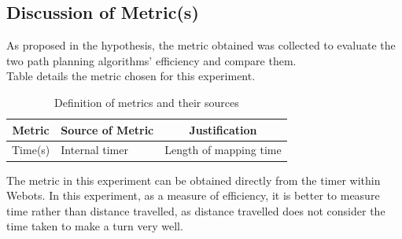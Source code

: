 \documentclass[conference]{IEEEtran}
\begin{document}
\subsection{Discussion of Metric(s)}
As proposed in the hypothesis, the metric obtained was collected to evaluate the two path planning algorithms' efficiency and compare them. \\
Table \uppercase\expandafter{} details the metric chosen for this experiment.

\begin{table}[htbp]
\centering
\setlength{\abovecaptionskip}{0.cm}
\caption{Definition of metrics and their sources}
\label{Table1}
\begin{tabular}{c|l|c}
\hline
Metric                & \multicolumn{1}{c|}{Source of Metric} & Justification     \\ \hline
Time(s)               & Internal timer            & Length of mapping time \\ \hline
\end{tabular}
\end{table}

The metric in this experiment can be obtained directly from the timer within Webots. In this experiment, as a measure of efficiency, it is better to measure time rather than distance travelled, as distance travelled does not consider the time taken to make a turn very well. 
\end{document}

